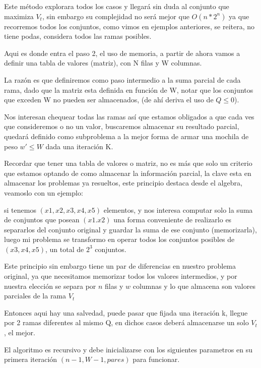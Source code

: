 \documentclass[fleqn, 11pt]{article}
\begin{document}
Este método explorara todos los casos y llegará sin duda al conjunto que
maximiza \textit{$V_t$}, sin embargo su complejidad no será mejor que $O(n *
2^n)$ ya que recorremos todos los conjuntos, como vimos en ejemplos anteriores,
se reitera, no tiene podas, considera todos las ramas posibles.

Aqui es donde entra el paso 2, el uso de memoria, a partir de ahora vamos a
definir una tabla de valores (matriz), con N filas y W columnas.

La razón es que definiremos como paso intermedio a la suma parcial de cada
rama, dado que la matriz esta definida en función de W, notar que los conjuntos
que exceden W no pueden ser almacenados, (de ahí deriva el uso de $Q \leq 0$).

Nos interesan chequear todas las ramas así que estamos obligados a que cada ves
que consideremos o no un valor, buscaremos almacenar su resultado parcial,
quedará definido como subproblema a la mejor forma de armar una mochila de peso
$w' \leq W$ dada una iteración K.

Recordar que tener una tabla de valores o matriz, no es más que solo un
criterio que estamos optando de como almacenar la información parcial, la clave
esta en almacenar los problemas ya resueltos, este principio destaca desde el
algebra, veamoslo con un ejemplo:

si tenemos $(x1,x2,x3,x4,x5)$ elementos, y nos interesa computar solo la suma
de conjuntos que posean $(x1.x2)$ una forma conveniente de realizarlo es
separarlos del conjunto original y guardar la suma de ese conjunto
(memorizarla), luego mi problema se transformo en operar todos los conjuntos
posibles de $(x3,x4,x5)$, un total de $2^3$ conjuntos.

Este principio sin embargo tiene un par de diferencias en nuestro problema
original, ya que necesitamos memorizar todos los valores intermedios, y por
nuestra elección se separa por $n$ filas y $w$ columnas y lo que almacena son
valores parciales de la rama \textit{$V_t$}

Entonces aqui hay una salvedad, puede pasar que fijada una iteración k, llegue
por 2 ramas diferentes al mismo Q, en dichos casos deberá almacenarse un solo
\textit{$V_t$}, el mejor.

El algoritmo es recursivo y debe inicializarse con los siguientes parametros en
su primera iteración $(n-1, W-1, pares)$ para funcionar.
\end{document}
